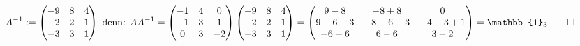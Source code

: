 \documentclass[titlepage]{article}
\newcommand{\1}{\mathbb{1}}
\newcommand{\0}{\mathbb{0}}
\begin{document}
		\begin{align*}
			A^{-1}:=
			\begin{pmatrix}
				-9&8&4\\
				-2&2&1\\
				-3&3&1
			\end{pmatrix}
			\text{ denn: }
			AA^{-1}=
			\begin{pmatrix}-1&4&0\\-1&3&1\\0&3&-2\end{pmatrix}
			\begin{pmatrix}-9&8&4\\-2&2&1\\-3&3&1\end{pmatrix}
			=
			\begin{pmatrix}9-8&-8+8&0\\9-6-3&-8+6+3&-4+3+1\\-6+6&6-6&3-2\end{pmatrix}
			=\1_3\qed
		\end{align*}
\end{document}
